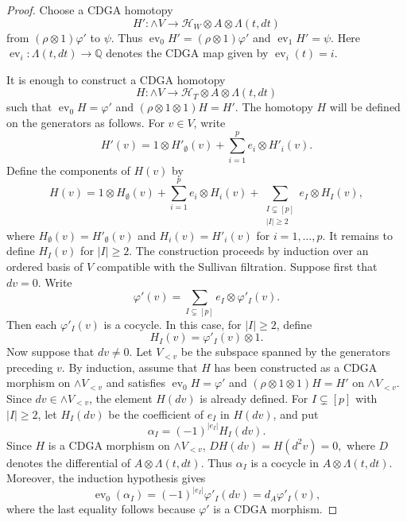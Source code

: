 \documentclass[a4paper,10pt]{amsart}
\theoremstyle{definition}
\theoremstyle{remark}
\newcommand{\ev}{\operatorname{ev}}
\numberwithin{equation}{section}
\begin{document}
\begin{proof}
Choose a CDGA homotopy
\[
H':
\wedge V
\longrightarrow
\mathcal H_W\otimes A\otimes \Lambda(t,dt)
\]
from $(\rho\otimes 1)\varphi'$ to $\psi$. Thus
$
\operatorname{ev}_0H'=(\rho\otimes 1)\varphi'
$
and
$
\ev_1H'=\psi.
$
Here $\ev_i:\Lambda(t,dt)\to \mathbb Q$ denotes the CDGA map given by $\operatorname{ev}_i (t) = i$.

It is enough to construct a CDGA homotopy
\[
H:
\wedge V
\longrightarrow
\mathcal H_T\otimes A\otimes \Lambda(t,dt)
\]
such that
$
\operatorname{ev}_0H=\varphi'
$
and
$
(\rho\otimes 1\otimes 1)H=H'.
$
The homotopy $H$ will be defined on the generators as follows.
For $v\in V$, write
\[
H'(v)
=
1\otimes H'_\emptyset(v)
+
\sum_{i=1}^p e_i\otimes H'_i(v).
\]
Define the components of $H(v)$ by
\[
H(v)
=
1\otimes H_\emptyset(v)
+
\sum_{i=1}^p e_i\otimes H_i(v)
+
\sum_{\substack{I\subsetneq[p]\\ |I|\geq 2}}
e_I\otimes H_I(v),
\]
where
$
H_\emptyset(v)=H'_\emptyset(v)
$
and
$
H_i(v)=H'_i(v)
$
for $i=1,\ldots,p$. It remains to define $H_I(v)$ for $|I|\geq 2$.
The construction proceeds by induction over an ordered basis of $V$ compatible
with the Sullivan filtration. Suppose first that $dv=0$.
Write
\[
        \varphi'(v)=\sum_{I\subsetneq[p]} e_I\otimes \varphi'_I(v).
\]
Then each $\varphi'_I(v)$ is a cocycle. In this case, for $|I|\geq 2$, define
\[
        H_I(v)=\varphi'_I(v)\otimes 1.
\]
Now suppose that $dv\neq 0$. Let $V_{<v}$ be the subspace spanned by the
generators preceding $v$.
By induction, assume that $H$ has been constructed
as a CDGA morphism on $\wedge V_{<v}$ and satisfies
$
\ev_0H=\varphi'
$
and
$
(\rho\otimes 1\otimes 1)H=H'
$
on $\wedge V_{<v}$. Since $dv\in\wedge V_{<v}$, the element $H(dv)$ is
already defined.
For $I\subsetneq[p]$ with $|I|\geq 2$, let $H_I(dv)$ be the
coefficient of $e_I$ in $H(dv)$, and put
\[
        \alpha_I=(-1)^{|e_I|}H_I(dv).
\]
Since $H$ is a CDGA morphism on $\wedge V_{<v}$,
$
        DH(dv)=H(d^2v)=0,
$
where $D$ denotes the differential of $A\otimes\Lambda(t,dt)$. 
Thus $\alpha_I$ is a cocycle in $A\otimes\Lambda(t,dt)$. 
Moreover, the induction hypothesis gives
\[
\operatorname{ev}_0(\alpha_I)
=
(-1)^{|e_I|}\varphi'_I(dv)
=
d_A\varphi'_I(v),
\]
where the last equality follows because $\varphi'$ is a CDGA morphism.


\end{proof}
\end{document}
